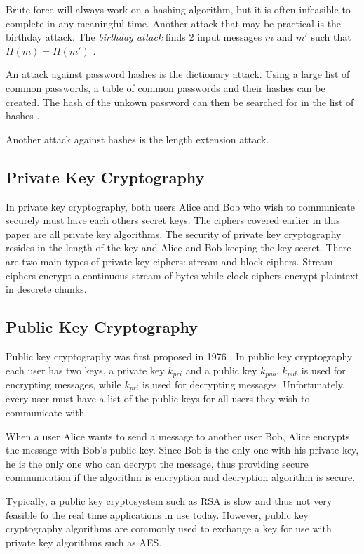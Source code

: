 \documentclass[12pt]{article}
\begin{document}
Brute force will always work on a hashing algorithm, but it is often infeasible to complete in any meaningful time. Another attack that may be practical is the birthday attack. The \textit{birthday attack} finds 2 input messages $m$ and $m'$ such that $H(m)=H(m')$ \cite{appcrypt}.

An attack against password hashes is the dictionary attack. Using a large list of common passwords, a table of common passwords and their hashes can be created. The hash of the unkown password can then be searched for in the list of hashes \cite[pg. 52]{appcrypt}.

Another attack against hashes is the length extension attack. 

\subsection{Private Key Cryptography}
In private key cryptography, both users Alice and Bob who wish to communicate securely must have each others secret keys. The ciphers covered earlier in this paper are all private key algorithms. The security of private key cryptography resides in the length of the key and Alice and Bob keeping the key secret. There are two main types of private key ciphers: stream and block ciphers. Stream ciphers encrypt a continuous stream of bytes while clock ciphers encrypt plaintext in descrete chunks.

\subsection{Public Key Cryptography}
Public key cryptography was first proposed in 1976 \cite[pg. 100]{absalg}\cite{diffiehellman}. In public key cryptography each user has two keys, a private key $k_{pri}$ and a public key $k_{pub}$. $k_{pub}$ is used for encrypting messages, while $k_{pri}$ is used for decrypting messages. Unfortunately, every user must have a list of the public keys for all users they wish to communicate with.

When a user Alice wants to send a message to another user Bob, Alice encrypts the message with Bob's public key. Since Bob is the only one with his private key, he is the only one who can decrypt the message, thus providing secure communication if the algorithm is encryption and decryption algorithm is secure.

Typically, a public key cryptosystem such as RSA is slow and thus not very feasible fo the real time applications in use today. However, public key cryptography algorithms are commonly used to exchange a key for use with private key algorithms such as AES.
\end{document}
